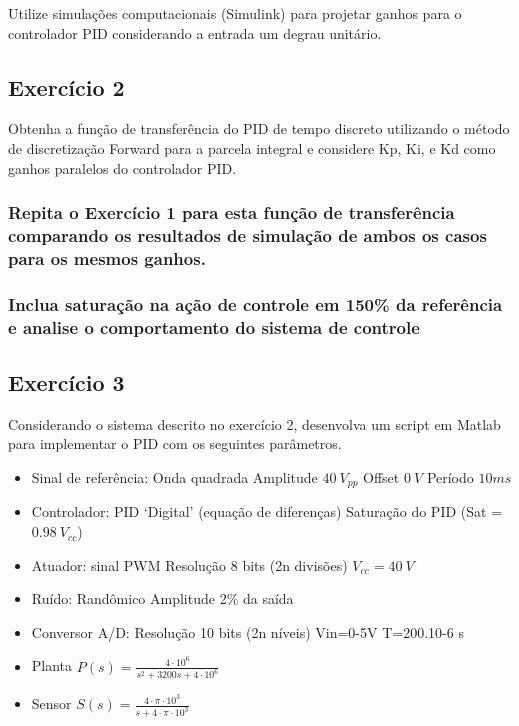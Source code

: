 Utilize simulações computacionais (Simulink\textregistered) para projetar ganhos para o controlador PID considerando a entrada um degrau unitário.

\subsection{Exercício 2}

Obtenha a função de transferência do PID de tempo discreto utilizando o método de discretização Forward para a parcela integral e considere Kp, Ki, e Kd como ganhos paralelos do controlador PID.

\subsubsection{Repita o Exercício 1 para esta função de transferência comparando os resultados de simulação de ambos os casos para os mesmos ganhos.}

\subsubsection{Inclua saturação na ação de controle em 150\% da referência e analise o comportamento do sistema de controle}

\subsection{Exercício 3}
Considerando o sistema descrito no exercício 2, desenvolva um script em Matlab para implementar o PID com os seguintes parâmetros.

\begin{itemize}
	\item Sinal de referência:
	Onda quadrada
	Amplitude $40~V_{pp}$
	Offset $0~V$
	Período $10ms$
	\item Controlador:
	PID ‘Digital’ (equação de diferenças)
	Saturação do PID (Sat = $0.98~V_{cc}$)
	\item Atuador: sinal PWM
	Resolução 8 bits (2n divisões)
	$V_{cc}=40~V$
	\item Ruído:
	Randômico
	Amplitude 2\% da saída
	\item Conversor A/D:
	Resolução 10 bits (2n níveis)
	Vin=0-5V
	T=200.10-6 s
	\item Planta
	$P(s)=\frac{4 \cdot 10^{6}}{s^{2}+3200s+4 \cdot 10^{6}}$
	\item Sensor
	$S(s)=\frac{4 \cdot \pi \cdot 10^{3}}{s + 4 \cdot \pi \cdot 10^{3}}$
\end{itemize}


